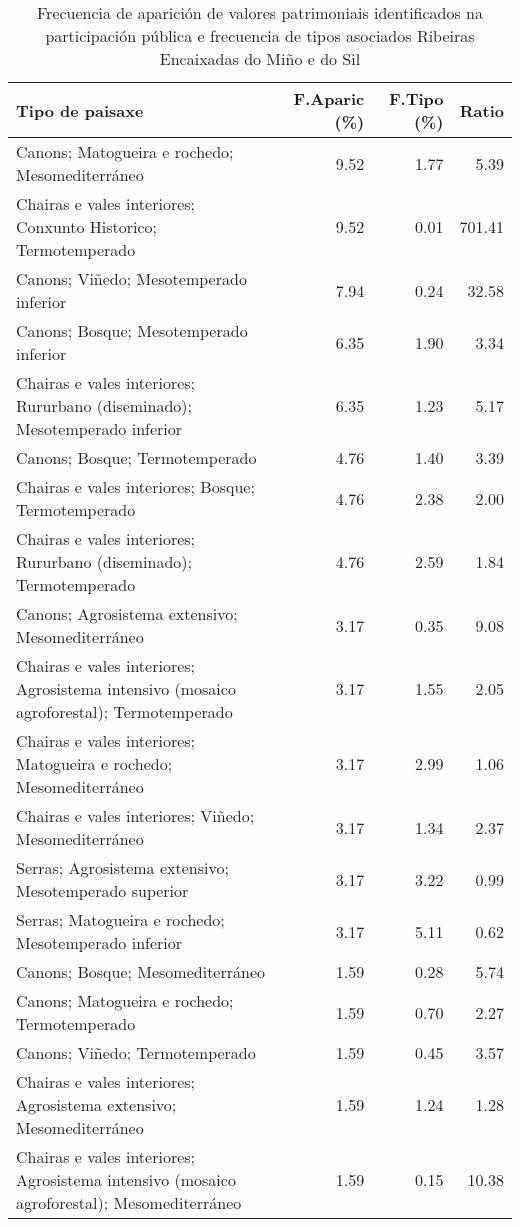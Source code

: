 \begin{table}[p]
\centering
\caption{Frecuencia de aparición de valores patrimoniais identificados na participación pública e frecuencia de tipos asociados Ribeiras Encaixadas do Miño e do Sil} 
\label{vsixotpat4}
\begin{tabular}{lrrr}
  \hline
Tipo de paisaxe & F.Aparic (\%) & F.Tipo (\%) & Ratio \\ 
  \hline
Canons; Matogueira e rochedo; Mesomediterráneo & 9.52 & 1.77 & 5.39 \\ 
  Chairas e vales interiores; Conxunto Historico; Termotemperado & 9.52 & 0.01 & 701.41 \\ 
  Canons; Viñedo; Mesotemperado inferior & 7.94 & 0.24 & 32.58 \\ 
  Canons; Bosque; Mesotemperado inferior & 6.35 & 1.90 & 3.34 \\ 
  Chairas e vales interiores; Rururbano (diseminado); Mesotemperado inferior & 6.35 & 1.23 & 5.17 \\ 
  Canons; Bosque; Termotemperado & 4.76 & 1.40 & 3.39 \\ 
  Chairas e vales interiores; Bosque; Termotemperado & 4.76 & 2.38 & 2.00 \\ 
  Chairas e vales interiores; Rururbano (diseminado); Termotemperado & 4.76 & 2.59 & 1.84 \\ 
  Canons; Agrosistema extensivo; Mesomediterráneo & 3.17 & 0.35 & 9.08 \\ 
  Chairas e vales interiores; Agrosistema intensivo (mosaico agroforestal); Termotemperado & 3.17 & 1.55 & 2.05 \\ 
  Chairas e vales interiores; Matogueira e rochedo; Mesomediterráneo & 3.17 & 2.99 & 1.06 \\ 
  Chairas e vales interiores; Viñedo; Mesomediterráneo & 3.17 & 1.34 & 2.37 \\ 
  Serras; Agrosistema extensivo; Mesotemperado superior & 3.17 & 3.22 & 0.99 \\ 
  Serras; Matogueira e rochedo; Mesotemperado inferior & 3.17 & 5.11 & 0.62 \\ 
  Canons; Bosque; Mesomediterráneo & 1.59 & 0.28 & 5.74 \\ 
  Canons; Matogueira e rochedo; Termotemperado & 1.59 & 0.70 & 2.27 \\ 
  Canons; Viñedo; Termotemperado & 1.59 & 0.45 & 3.57 \\ 
  Chairas e vales interiores; Agrosistema extensivo; Mesomediterráneo & 1.59 & 1.24 & 1.28 \\ 
  Chairas e vales interiores; Agrosistema intensivo (mosaico agroforestal); Mesomediterráneo & 1.59 & 0.15 & 10.38 \\ 

\end{tabular}
\end{table}
